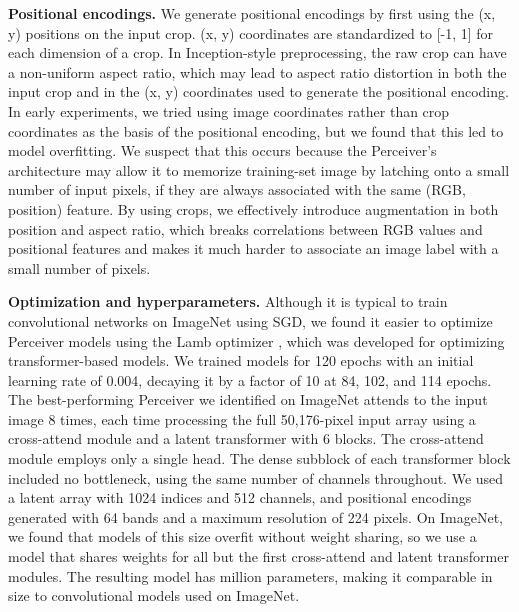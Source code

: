 \documentclass{article}
\begin{document}
\noindent \textbf{Positional encodings.} We generate positional encodings by first using the (x, y) positions on the  input crop. (x, y) coordinates are standardized to [-1, 1] for each dimension of a crop. In Inception-style preprocessing, the raw crop can have a non-uniform aspect ratio, which may lead to aspect ratio distortion in both the input crop and in the (x, y) coordinates used to generate the positional encoding. In early experiments, we tried using image coordinates rather than crop coordinates as the basis of the positional encoding, but we found that this led to model overfitting. We suspect that this occurs because the Perceiver's architecture may allow it to memorize training-set image by latching onto a small number of input pixels, if they are always associated with the same (RGB, position) feature. By using crops, we effectively introduce augmentation in both position and aspect ratio, which breaks correlations between RGB values and positional features and makes it much harder to associate an image label with a small number of pixels.

\noindent \textbf{Optimization and hyperparameters.} Although it is typical to train convolutional networks on ImageNet using SGD, we found it easier to optimize Perceiver models using the Lamb optimizer \cite{you2020large}, which was developed for optimizing transformer-based models. We trained models for 120 epochs with an initial learning rate of 0.004, decaying it by a factor of 10 at 84, 102, and 114 epochs. The best-performing Perceiver we identified on ImageNet attends to the input image 8 times, each time processing the full 50,176-pixel input array using a cross-attend module and a latent transformer with 6 blocks. The cross-attend module employs only a single head. The dense subblock of each transformer block included no bottleneck, using the same number of channels throughout. We used a latent array with 1024 indices and 512 channels, and positional encodings generated with 64 bands and a maximum resolution of 224 pixels. On ImageNet, we found that models of this size overfit without weight sharing, so we use a model that shares weights for all but the first cross-attend and latent transformer modules. The resulting model has  million parameters, making it comparable in size to convolutional models used on ImageNet.
\end{document}
